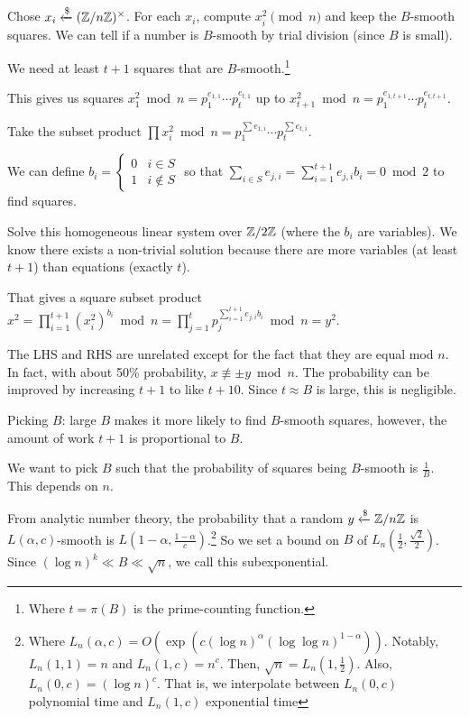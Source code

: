 \documentclass[notes]{agony}
\newcommand{\xgets}{\xleftarrow}
\newcommand{\ndgets}{\xgets{\mathdollar}}
\newcommand{\mgrp}[1]{(\Z/#1\Z)^\times}
\begin{document}
Chose $x_i \ndgets \mgrp{n}$.
For each $x_i$, compute $x_i^2 \pmod n$ and keep the $B$-smooth squares.
We can tell if a number is $B$-smooth by trial division (since $B$ is small).

We need at least $t+1$ squares that are $B$-smooth.\footnote{Where $t=\pi(B)$ is the prime-counting function.}

This gives us squares $x_1^2 \bmod n = p_1^{e_{1,1}}\dotsb p_t^{e_{t,1}}$
up to $x_{t+1}^2 \bmod n = p_1^{e_{1,t+1}}\dotsb p_t^{e_{t,t+1}}$.

Take the subset product $\prod x_i^2 \bmod n = p_1^{\sum e_{1,i}}\dotsb p_t^{\sum e_{t,i}}$.

We can define $b_i = \begin{cases}0 & i \in S \\ 1 & i \not\in S\end{cases}$
so that $\sum_{i\in S}e_{j,i} = \sum_{i=1}^{t+1}e_{j,i}b_i = 0 \bmod 2$
to find squares.

Solve this homogeneous linear system over $\mathbb{Z}/2\mathbb{Z}$ (where the $b_i$ are variables).
We know there exists a non-trivial solution because there are more variables (at least $t+1$) than equations (exactly $t$).

That gives a square subset product $x^2 = \prod\limits_{i=1}^{t+1} (x_i^2)^{b_i} \bmod n
  = \prod\limits_{j=1}^t p_j^{\sum_{i=1}^{t+1} e_{j,i} b_i} \bmod n = y^2$.

The LHS and RHS are unrelated except for the fact that they are equal mod $n$.
In fact, with about 50\% probability, $x \not\equiv \pm y \bmod n$.
The probability can be improved by increasing $t+1$ to like $t+10$.
Since $t \approx B$ is large, this is negligible.

Picking $B$: large $B$ makes it more likely to find $B$-smooth squares, however,
the amount of work $t+1$ is proportional to $B$.

We want to pick $B$ such that the probability of squares being $B$-smooth is $\frac1B$.
This depends on $n$.

From analytic number theory, the probability that a random $y \ndgets \Z/n\Z$
is $L(\alpha,c)$-smooth is $L(1-\alpha,\frac{1-\alpha}{c})$.\footnote{Where $L_n(\alpha,c) = O(\exp(c(\log n)^\alpha(\log\log n)^{1-\alpha}))$.
  Notably, $L_n(1,1) = n$ and $L_n(1,c) = n^c$. Then, $\sqrt{n} = L_n(1,\frac12)$.
  Also, $L_n(0,c) = (\log n)^c$.
  That is, we interpolate between $L_n(0,c)$ polynomial time and $L_n(1,c)$ exponential time}
So we set a bound on $B$ of $L_n(\frac12,\frac{\sqrt2}{2})$.
Since $(\log n)^k \ll B \ll \sqrt{n}$, we call this subexponential.
\end{document}
